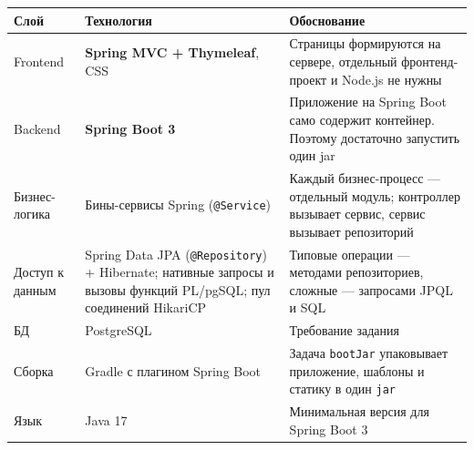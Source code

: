 \documentclass[a4paper,12pt]{article}
\begin{document}
\begin{longtable}{|>{\raggedright\arraybackslash}p{34mm}|>{\raggedright\arraybackslash}p{48mm}|>{\raggedright\arraybackslash}p{72mm}|}
\hline
\rowcolor{black!8}\textbf{Слой} & \textbf{Технология} & \textbf{Обоснование} \\ \hline
\endhead
Frontend & \textbf{Spring MVC + Thymeleaf}, CSS & Страницы формируются на сервере, отдельный фронтенд-проект и Node.js не нужны \\ \hline
Backend & \textbf{Spring Boot 3}  & Приложение на Spring Boot само содержит контейнер. Поэтому достаточно запустить один jar \\ \hline
Бизнес-логика & Бины-сервисы Spring (\texttt{@Service}) & Каждый бизнес-процесс — отдельный модуль; контроллер вызывает сервис, сервис вызывает репозиторий \\ \hline
Доступ к данным & Spring Data JPA (\texttt{@Repository}) + Hibernate; нативные запросы и вызовы функций PL/pgSQL; пул соединений HikariCP & Типовые операции — методами репозиториев, сложные — запросами JPQL и SQL \\ \hline
БД & PostgreSQL & Требование задания \\ \hline
Сборка & Gradle с плагином Spring Boot & Задача \texttt{bootJar} упаковывает приложение, шаблоны и статику в один \texttt{jar} \\ \hline
Язык & Java 17 & Минимальная версия для Spring Boot 3 \\ \hline
\end{longtable}
 
\end{document}

